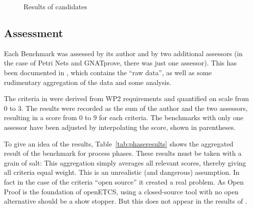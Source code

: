  \begin{figure}
  \centering
  \caption{Results of candidates}
  \label{fig:results}
\end{figure}

\subsection{Assessment}
\label{sec:assessment}

Each Benchmark was assessed by its author and by two additional assessors (in the case of Petri Nets and GNATprove, there was just one assessor).  This has been documented in \cite{WP7_O719}, which contains the ``raw data'', as well as some rudimentary aggregation of the data and some analysis.

The criteria in \cite{WP7_O719} were derived from WP2 requirements and quantified on scale from 0 to 3.  The results were recorded as the sum of the author and the two assessors, resulting in a score from 0 to 9 for each criteria.  The benchmarks with only one assessor have been adjusted by interpolating the score, shown in parentheses.

To give an idea of the results, Table~\ref{tab:phaseresults} shows the aggregated result of the benchmark for process phases.  These results must be taken with a grain of salt: This aggregation simply averages all relevant scores, thereby giving all criteria equal weight.  This is an unrealistic (and dangerous) assumption.  In fact in the case of the criteria ``open source'' it created a real problem.  As Open Proof is the foundation of openETCS, using a closed-source tool with no open alternative should be a show stopper.  But this does not appear in the results of \citep{WP7_O719}.

